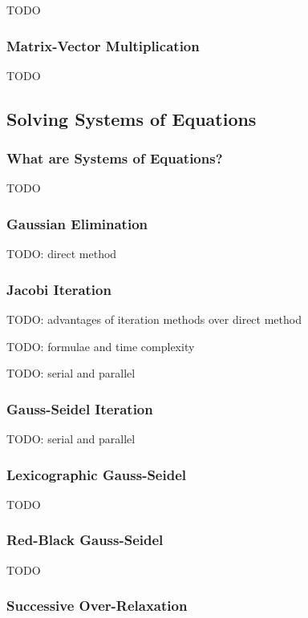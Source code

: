 \documentclass{article}
\begin{document}
TODO

\subsubsection{Matrix-Vector Multiplication}

TODO

\subsection{Solving Systems of Equations}

\subsubsection{What are Systems of Equations?}

TODO

\subsubsection{Gaussian Elimination}

TODO: direct method

\subsubsection{Jacobi Iteration}

TODO: advantages of iteration methods over direct method

TODO: formulae and time complexity

TODO: serial and parallel

\subsubsection{Gauss-Seidel Iteration}

TODO: serial and parallel

\subsubsection{Lexicographic Gauss-Seidel}

TODO

\subsubsection{Red-Black Gauss-Seidel}

TODO

\subsubsection{Successive Over-Relaxation}
\end{document}
